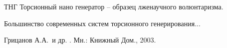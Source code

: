 \documentclass[koi8-r,usehyperref,12pt]{G7-32}
\begin{document}
\NormRefs %
\Defines %


\Abbreviations %
\begin{abbreviation}
\item[ТНГ] Торсионный нано генератор -- образец лженаучного волюнтаризма.
\end{abbreviation}

\Introduction
Большинство современных систем торсионного\cite{filosofyNewestdict} генерирования...

\backmatter %

\Conclusion %

\begin{thebibliography}{1} %

{Грицанов} А.А.~и др.
.
\newblock Мн.: Книжный Дом., 2003.

\end{thebibliography}

\end{document}
